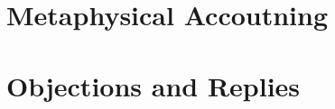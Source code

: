 \documentclass[12pt]{article}
\begin{document}

\section{Metaphysical Accoutning} %
\label{sec:metaphysical_accoutning}


\section{Objections and Replies} %
\label{sec:objections_and_replies}



\nocite{Cooper:1997fk}

 
 
\end{document}
